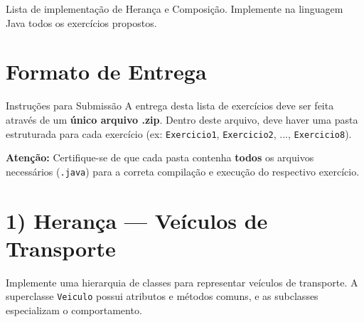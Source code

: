 \documentclass[12pt]{article}
\begin{document}
Lista de implementação de Herança e Composição. Implemente na linguagem Java todos os exercícios propostos.
\section*{Formato de Entrega}


\begin{block}{Instruções para Submissão}
A entrega desta lista de exercícios deve ser feita através de um \textbf{único arquivo .zip}.
Dentro deste arquivo, deve haver uma pasta estruturada para cada exercício (ex: \texttt{Exercicio1}, \texttt{Exercicio2}, ..., \texttt{Exercicio8}).

\textbf{Atenção:} Certifique-se de que cada pasta contenha \textbf{todos} os arquivos necessários (\texttt{.java}) para a correta compilação e execução do respectivo exercício.
\end{block}


\section*{1) Herança — Veículos de Transporte}
Implemente uma hierarquia de classes para representar veículos de transporte. A superclasse \texttt{Veiculo} possui atributos e métodos comuns, e as subclasses especializam o comportamento.
\end{document}
